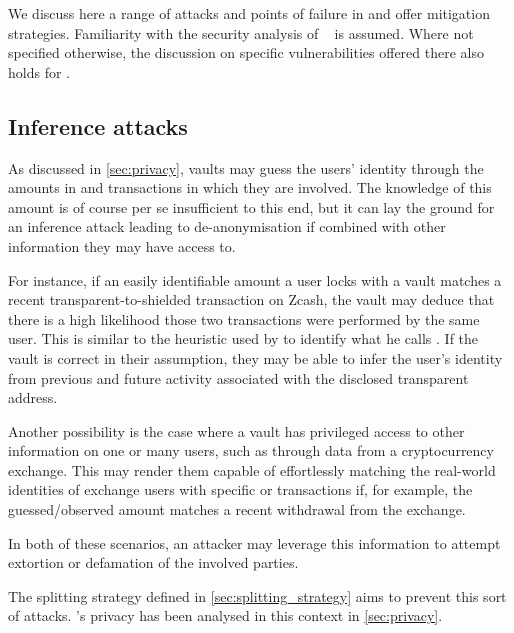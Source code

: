 We discuss here a range of attacks and points of failure in \zclaim and offer mitigation strategies.
Familiarity with the security analysis of \xclaim~\cite[Section~VII]{zamyatin2019xclaim} is assumed.
Where not specified otherwise, the discussion on specific vulnerabilities offered there also holds for \zclaim.

\subsection{Inference attacks}
\label{sec:inference_attacks}

As discussed in \cref{sec:privacy}, vaults may guess the users' identity through the amounts in \lock and \release transactions in which they are involved.
The knowledge of this amount is of course per se insufficient to this end, but it can lay the ground for an inference attack leading to de-anonymisation if combined with other information they may have access to.

For instance, if an easily identifiable amount a user locks with a vault matches a recent transparent-to-shielded transaction on Zcash, the vault may deduce that there is a high likelihood those two transactions were performed by the same user.
This is similar to the heuristic used by \textcite{quesnelle2017linkability} to identify what he calls .
If the vault is correct in their assumption, they may be able to infer the user's identity from previous and future activity associated with the disclosed transparent address.

Another possibility is the case where a vault has privileged access to other information on one or many users, such as through data from a cryptocurrency exchange.
This may render them capable of effortlessly matching the real-world identities of exchange users with specific \lock or \release transactions if, for example, the guessed/observed amount matches a recent withdrawal from the exchange.

In both of these scenarios, an attacker may leverage this information to attempt extortion or defamation of the involved parties.

The splitting strategy defined in \cref{sec:splitting_strategy} aims to prevent this sort of attacks.
\zclaim's privacy has been analysed in this context in \cref{sec:privacy}.

